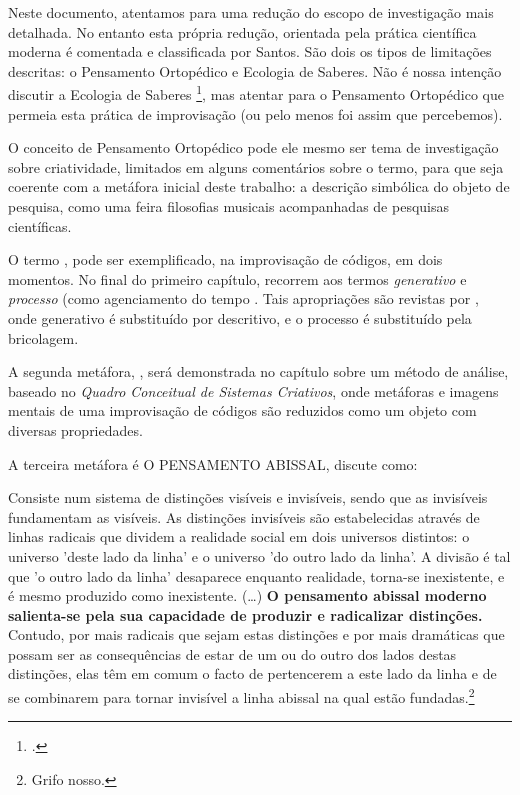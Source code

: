 Neste documento, atentamos para uma redução do escopo de investigação mais detalhada. No entanto esta própria redução, orientada pela prática científica moderna é comentada e classificada por Santos. São dois os tipos de limitações descritas: o Pensamento Ortopédico e Ecologia de Saberes. Não é nossa intenção discutir a Ecologia de Saberes \footnote{.}, mas atentar para o Pensamento Ortopédico que permeia esta prática de improvisação (ou pelo menos foi assim que percebemos). 

O conceito de Pensamento Ortopédico pode ele mesmo ser tema de investigação sobre criatividade, limitados em  alguns comentários sobre o termo, para que seja coerente com a metáfora inicial deste trabalho: a descrição simbólica do objeto de pesquisa, como uma feira filosofias musicais acompanhadas de pesquisas científicas. 

O termo , pode ser exemplificado, na improvisação de códigos, em dois momentos. No final do primeiro capítulo,  recorrem aos termos \emph{generativo} e \emph{processo} (como agenciamento do tempo . Tais apropriações são revistas por , onde generativo é substituído por descritivo, e o processo é substituído pela bricolagem. 

A segunda metáfora,  \cite[p.~15]{santos_filosofia_2008}, será demonstrada no capítulo sobre um método de análise, baseado no \emph{Quadro Conceitual de Sistemas Criativos}\cite{mclean_music_2006,Forth2010}, onde metáforas e imagens mentais de uma improvisação de códigos são reduzidos como um objeto com diversas propriedades. 

A terceira metáfora é \MakeTextUppercase{o pensamento abissal},  discute como:

\begin{citacao}
Consiste num sistema de distinções visíveis e invisíveis, sendo que as invisíveis fundamentam as visíveis. As distinções invisíveis são estabelecidas através de linhas radicais que dividem a realidade social em dois universos distintos: o universo  'deste lado da linha' e o universo 'do outro lado da linha'. A divisão é tal que 'o outro lado da linha' desaparece enquanto realidade, torna-se inexistente, e é mesmo produzido como inexistente. (\ldots) \textbf{O pensamento abissal moderno salienta-se pela sua capacidade de produzir e radicalizar distinções.} Contudo, por mais radicais que sejam estas distinções e por mais dramáticas que possam ser as consequências de estar de um ou do outro dos lados destas distinções, elas têm em comum o facto de pertencerem a este lado da linha e de se combinarem para tornar invisível a linha abissal na qual estão fundadas.\footnote{Grifo nosso.} 
\end{citacao}


